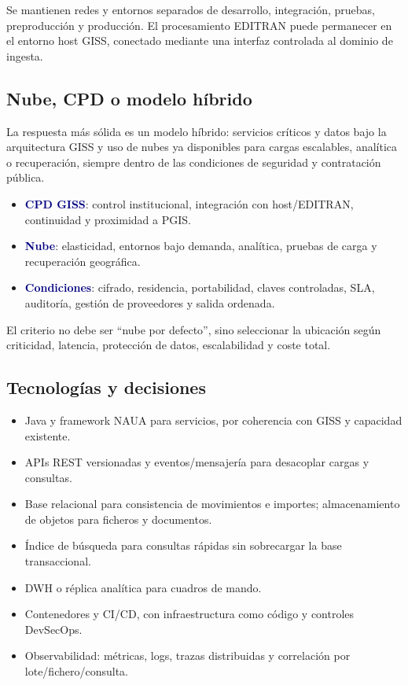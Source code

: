 \documentclass[11pt,a4paper]{article}
\newcommand{\key}[1]{\textbf{\textcolor{navy}{#1}}}
\begin{document}
Se mantienen redes y entornos separados de desarrollo, integración, pruebas, preproducción y producción. El procesamiento EDITRAN puede permanecer en el entorno host GISS, conectado mediante una interfaz controlada al dominio de ingesta.

\subsection{Nube, CPD o modelo híbrido}

La respuesta más sólida es un modelo híbrido: servicios críticos y datos bajo la arquitectura GISS y uso de nubes ya disponibles para cargas escalables, analítica o recuperación, siempre dentro de las condiciones de seguridad y contratación pública.

\begin{itemize}
\item \key{CPD GISS}: control institucional, integración con host/EDITRAN, continuidad y proximidad a PGIS.
\item \key{Nube}: elasticidad, entornos bajo demanda, analítica, pruebas de carga y recuperación geográfica.
\item \key{Condiciones}: cifrado, residencia, portabilidad, claves controladas, SLA, auditoría, gestión de proveedores y salida ordenada.
\end{itemize}

El criterio no debe ser ``nube por defecto'', sino seleccionar la ubicación según criticidad, latencia, protección de datos, escalabilidad y coste total.

\subsection{Tecnologías y decisiones}
\begin{itemize}
\item Java y framework NAUA para servicios, por coherencia con GISS y capacidad existente.
\item APIs REST versionadas y eventos/mensajería para desacoplar cargas y consultas.
\item Base relacional para consistencia de movimientos e importes; almacenamiento de objetos para ficheros y documentos.
\item Índice de búsqueda para consultas rápidas sin sobrecargar la base transaccional.
\item DWH o réplica analítica para cuadros de mando.
\item Contenedores y CI/CD, con infraestructura como código y controles DevSecOps.
\item Observabilidad: métricas, logs, trazas distribuidas y correlación por lote/fichero/consulta.
\end{itemize}
\end{document}
